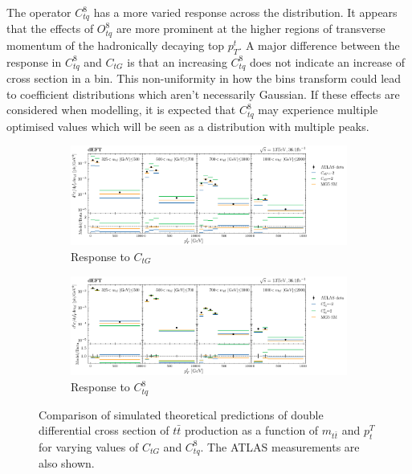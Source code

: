 \documentclass[a4paper,11pt]{article}
\begin{document}
The operator $C_{tq}^{8}$ has a more varied response across the distribution.
It appears that the effects of $O_{tq}^{8}$ are more prominent at the higher regions of transverse momentum of the hadronically decaying top $p_{T}^{t}$.
A major difference between the response in $C_{tq}^{8}$ and $C_{tG}$ is that an increasing $C_{tq}^{8}$ does not indicate an increase of cross section in a bin.
This non-uniformity in how the bins transform could lead to coefficient distributions which aren't necessarily Gaussian.
If these effects are considered when modelling, it is expected that $C_{tq}^{8}$ may experience multiple optimised values which will be seen as a distribution with multiple peaks.

\begin{figure}[H]
    \centering
    \begin{subfigure}[b]{\textwidth}
        \centering
        \includegraphics[width=\textwidth]{plots/data_plot_ctg.png}
        \caption{Response to $C_{tG}$}
    \end{subfigure}

    \begin{subfigure}[b]{\textwidth}
        \centering
        \includegraphics[width=\textwidth]{plots/data_plot_ctq.png}
        \caption{Response to $C_{tq}^{8}$}
    \end{subfigure}
    \caption{Comparison of simulated theoretical predictions of double differential cross section of $t\bar{t}$ production as a function of $m_{t\bar{t}}$ and $p_{t}^{T}$ for varying values of $C_{tG}$ and $C_{tq}^{8}$. The ATLAS measurements are also shown.}
    \label{fig:comparison}
\end{figure}
\end{document}
